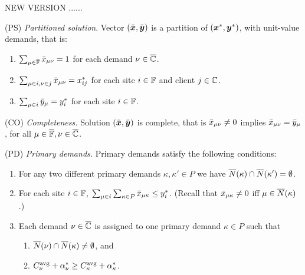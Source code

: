 \documentclass[11pt]{article}
\begin{document}
NEW VERSION ......

\begin{description}
	
      \renewcommand{\theenumii}{(\alph{enumii})}
      \renewcommand{\labelenumii}{\theenumii}

\item{(PS)} \emph{Partitioned solution}.
Vector $(\bar{\boldsymbol{x}},\bar{\boldsymbol{y}})$ is a partition of $(\boldsymbol{x}^\ast,\boldsymbol{y}^\ast)$, with unit-value
  demands, that is:

	\begin{enumerate}
	\item \label{PS1:one} 
          $\sum_{\mu\in\overline{\mathbb{F}}} {\bar x}_{\mu\nu} = 1$ for each demand $\nu\in\overline{\mathbb{C}}$. 
	\item \label{PS1:xij} $\sum_{\mu\in i, \nu\in j} {\bar x}_{\mu\nu}
          = x^\ast_{ij}$ for each site $i\in\mathbb{F}$ and client $j\in\mathbb{C}$.
	\item \label{PS1:yi}
          $\sum_{\mu\in i} {\bar y}_{\mu} = y^\ast_i$ for each site $i\in\mathbb{F}$.
	\end{enumerate}
		
\item{(CO)} \emph{Completeness.}
	Solution   $(\bar{\boldsymbol{x}},\bar{\boldsymbol{y}})$ is complete, that is ${\bar x}_{\mu\nu}\neq 0$ implies
				${\bar x}_{\mu\nu} = {\bar y}_{\mu}$, for all $\mu\in\overline{\mathbb{F}}, \nu\in\overline{\mathbb{C}}$.

\item{(PD)} \emph{Primary demands.}
	Primary demands satisfy the following conditions:

	\begin{enumerate}
		
	\item\label{PD:disjoint}  For any two different primary demands $\kappa,\kappa'\in P$ we have
				${\overline{N}}(\kappa)\cap {\overline{N}}(\kappa') = \emptyset$.

	\item \label{PD:yi} For each site $i\in\mathbb{F}$, 
		$ \sum_{\mu\in i}\sum_{\kappa\in P}{\bar x}_{\mu\kappa} \leq y_i^\ast$.
		(Recall that ${\bar x}_{\mu\kappa}\neq 0$ iff $\mu\in {\overline{N}}(\kappa)$.)
		
	\item \label{PD:assign} Each demand $\nu\in\overline{\mathbb{C}}$ is assigned
        to one primary demand $\kappa\in P$ such that

  			\begin{enumerate}
	
				\item \label{PD:assign:overlap} ${\overline{N}}(\nu) \cap {\overline{N}}(\kappa) \neq \emptyset$, and
				\item \label{PD:assign:cost} $C^{{\mbox{\scriptsize\rm avg}}}_{\nu}+\alpha_{\nu}^\ast \geq
        			C^{{\mbox{\scriptsize\rm avg}}}_{\kappa}+\alpha_{\kappa}^\ast$.


\end{enumerate}
\end{enumerate}
\end{description}
\end{document}
